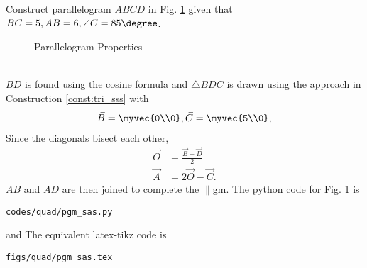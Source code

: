 %
\item Construct parallelogram $ABCD$ 	in Fig. \ref{fig:pgm_sas}	
given that  $BC = 5, AB = 6, \angle C = 85 \degree$.
\begin{figure}[!ht]
	\begin{center}
		\resizebox{\columnwidth}{!}{}
	\end{center}
	\caption{Parallelogram Properties}
	\label{fig:pgm_sas}	
\end{figure}
%
\\
\solution $BD$ is found using the cosine formula and $\triangle BDC$ is drawn using the approach in Construction \ref{const:tri_sss} with 
%
\begin{align}
\vec{B} = \myvec{0\\0},
\vec{C} = \myvec{5\\0},
\end{align}
%
Since the diagonals bisect each other, 
%
\begin{align}
\vec{O} &= \frac{\vec{B}+\vec{D}}{2}
\\
\vec{A} &= 2\vec{O} - \vec{C}.
\end{align}
%
$AB$ and $AD$ are then joined to complete the $\parallel$gm.
The python code for  Fig. \ref{fig:pgm_sas} is
\begin{lstlisting}
codes/quad/pgm_sas.py
\end{lstlisting}
%
and 
The equivalent latex-tikz code is
%
\begin{lstlisting}
figs/quad/pgm_sas.tex
\end{lstlisting}
%

